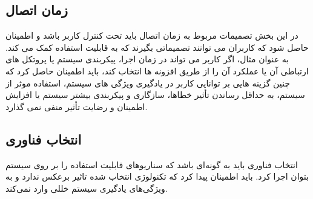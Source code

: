 \subsection{زمان اتصال}
در این بخش تصمیمات مربوط به زمان  اتصال باید تحت کنترل کاربر باشد و اطمینان حاصل شود که کاربران می توانند تصمیماتی بگیرند که به قابلیت استفاده کمک می کند.
به عنوان مثال، اگر کاربر می تواند در زمان اجرا، پیکربندی سیستم یا پروتکل های ارتباطی آن یا عملکرد آن را از طریق افزونه ها انتخاب کند، باید اطمینان حاصل کرد که چنین گزینه هایی بر توانایی کاربر در یادگیری ویژگی های سیستم، استفاده موثر از سیستم، به حداقل رساندن تأثیر خطاها، سازگاری و پیکربندی بیشتر سیستم یا افزایش اطمینان و رضایت 
تأثیر منفی نمی گذارد.
\subsection{انتخاب فناوری}
انتخاب فناوری باید به گونه‌ای باشد که سناریو‌های قابلیت استفاده را بر روی سیستم بتوان اجرا کرد.
باید اطمینان پیدا کرد که تکنولوژی انتخاب شده تاثیر برعکس ندارد و به ویژگی‌های یادگیری سیستم خللی وارد نمی‌کند. 